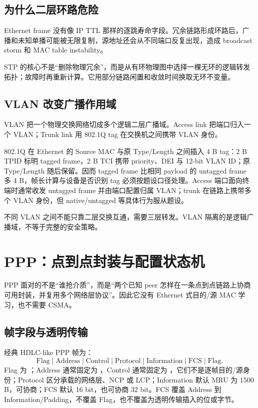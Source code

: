 \documentclass[UTF8,fontset=none,11pt,a4paper]{ctexart}
\begin{document}
\subsection{为什么二层环路危险}\label{81-ux4e3aux4ec0ux4e48ux4e8cux5c42ux73afux8defux5371ux9669}

Ethernet frame 没有像 IP TTL
那样的逐跳寿命字段。冗余链路形成环路后，广播和未知单播可能被无限复制，源地址还会从不同端口反复出现，造成
broadcast storm 和 MAC table instability。

STP
的核心不是``删除物理冗余''，而是从有环物理图中选择一棵无环的逻辑转发拓扑；故障时再重新计算。它用部分链路闲置和收敛时间换取无环不变量。

\subsection{VLAN
改变广播作用域}\label{82-vlan-ux6539ux53d8ux5e7fux64adux4f5cux7528ux57df}

VLAN 把一个物理交换网络切成多个逻辑二层广播域。Access link
把端口归入一个 VLAN；Trunk link 用 802.1Q tag 在交换机之间携带 VLAN
身份。

802.1Q 在 Ethernet 的 Source MAC 与原 Type/Length 之间插入 4 B tag：2 B TPID 标明 tagged frame，2 B TCI 携带 priority、DEI 与 12-bit VLAN ID；原 Type/Length 随后保留。因而 tagged frame 比相同 payload 的 untagged frame 多 4 B，帧长计算与设备是否识别 tag 必须按题设口径处理。Access 端口面向终端时通常收发 untagged frame 并由端口配置归属 VLAN；trunk 在链路上携带多个 VLAN 身份，但 native/untagged 等具体行为服从题设。

不同 VLAN 之间不能只靠二层交换互通，需要三层转发。VLAN
隔离的是逻辑广播域，不等于完整的安全策略。

\section{PPP：点到点封装与配置状态机}

PPP 面对的不是“谁抢介质”，而是“两个已知 peer 怎样在一条点到点链路上协商可用封装，并复用多个网络层协议”。因此它没有 Ethernet 式目的/源 MAC 学习，也不需要 CSMA。

\subsection{帧字段与透明传输}

经典 HDLC-like PPP 帧为：
\[
\boxed{\text{Flag}\mid\text{Address}\mid\text{Control}\mid\text{Protocol}
\mid\text{Information}\mid\text{FCS}\mid\text{Flag}}.
\]
Flag 为 ；Address 通常固定为 ，Control 通常固定为 ，它们不是逐帧目的/源身份；Protocol 区分承载的网络层、NCP 或 LCP；Information 默认 MRU 为 1500 B，可协商；FCS 默认 16 bit，也可协商 32 bit。FCS 覆盖 Address 到 Information/Padding，不覆盖 Flag，也不覆盖为透明传输插入的位或字节。
\end{document}
